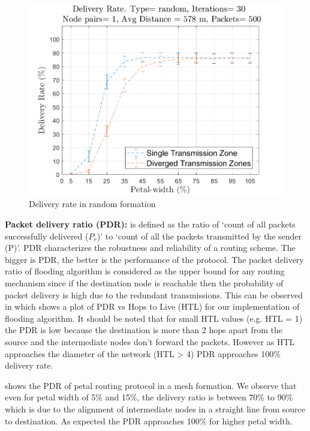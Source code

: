 \begin{figure}[hbtp]
\centering
\includegraphics[width=\simResultFigSize \textwidth]{ncsuthesis-0.6/Chapter-5/figs/pe_DR_random.png}
\caption{Delivery rate in random formation}
\label{fig:pe_DR_random}
\end{figure}

\textbf{Packet delivery ratio (PDR):} is defined as the ratio of `count of all packets successfully delivered ($P_r$)' to `count of all the packets transmitted by the sender (P)'. PDR characterizes the robustness and reliability of a routing scheme. The bigger is PDR, the better is the performance of the protocol. 
The packet delivery ratio of flooding algorithm is considered as the upper bound for any routing mechanism since if the destination node is reachable then the probability of packet delivery is high due to the redundant transmissions. This can be observed in  which shows a plot of PDR vs Hops to Live (HTL) for our implementation of flooding algorithm. It should be noted that for small HTL values (e.g. HTL = 1) the PDR is low because the destination is more than 2 hops apart from the source and the intermediate nodes don't forward the packets. However as HTL approaches the diameter of the network (HTL > 4) PDR approaches 100\% delivery rate. 

 shows the PDR of petal routing protocol in a mesh formation. We observe that even for petal width of 5\% and 15\%, the delivery ratio is between 70\% to 90\% which is due to the alignment of intermediate nodes in a straight line from source to destination. As expected the PDR approaches 100\% for higher petal width.

